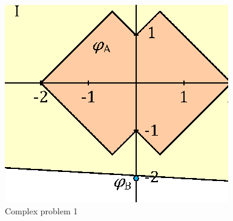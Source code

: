 \begin{figure}
\begin{center}
\includegraphics[scale=1.1]{figures/int1.eps}
\end{center}
\caption{Complex problem 1}
\label{fig:int1}
\end{figure}

